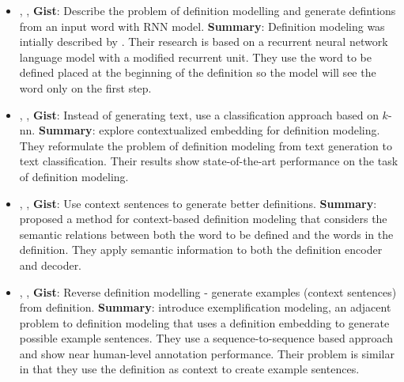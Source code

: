 \documentclass{article}[a4paper]
\newcommand{\bitem}[3]{
    \item[\cite{#1}]
        \citetitle{#1}, \citeauthor{#1}, \citeyear{#1}
        \newline
        \textbf{Gist}: {#2}
        \newline
        \textbf{Summary}: {#3} }
\begin{document}
\begin{itemize}
    \bitem{noraset_definition_2016}%
    {Describe the problem of definition modelling and generate defintions from
        an input word with RNN model.}%
    {Definition modeling was intially described by
        \citeauthor{noraset_definition_2016}. Their research is based on a
        recurrent neural network language model \cite{mikolov_recurrent_2010}
        with a modified recurrent unit. They use the word to be defined placed
        at the beginning of the definition so the model will see the word only
        on the first step.}

    \bitem{chang_what_2019}%
    {Instead of generating text, use a classification approach based on
        $k$-nn.}%
    {\citeauthor{chang_what_2019} explore contextualized embedding for
        definition modeling. They reformulate the problem of definition modeling
        from text generation to text classification. Their results show
        state-of-the-art performance on the task of definition modeling.}

    \bitem{washio_bridging_2019}%
    {Use context sentences to generate better definitions.}%
    {\citeauthor{washio_bridging_2019} proposed a method for context-based
        definition modeling that considers the semantic relations between both
        the word to be defined and the words in the definition. They apply
        semantic information to both the definition encoder and decoder.}

    \bitem{barba_exemplification_2021}%
    {Reverse definition modelling - generate examples (context sentences) from
        definition.}%
    {\citeauthor{barba_exemplification_2021} introduce exemplification modeling,
        an adjacent problem to definition modeling that uses a definition
        embedding to generate possible example sentences. They use a
        sequence-to-sequence based approach and show near human-level annotation
        performance. Their problem is similar in that they use the definition as
        context to create example sentences.}








\end{itemize}
\end{document}
